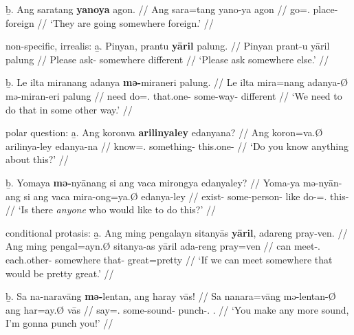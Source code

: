 	\b{b.} \begingl
		\gla Ang saratang \textbf{yanoya} agon. //
		\glb Ang sara=tang yano-ya agon //
		\glc \AgtT{} go=\TplM{}.\Aarg{} place-\Loc{} foreign //
		\glft `They are going somewhere foreign.' //
		\endgl
	\endsubsub

\a non-specific, irrealis:\vspace{.5em} %
	\beginsubsub
	\b{a.} \begingl
		\gla Pinyan, prantu \textbf{yāril} palung. //
		\glb Pinyan prant-u yāril palung //
		\glc Please ask-\Imp{} somewhere different //
		\glft `Please ask somewhere else.' //
		\endgl\vspace{.5em}
		
	\b{b.} \begingl
		\gla Le ilta miranang adanya \textbf{mə-}miraneri 
			palung. //
		\glb Le ilta mira=nang adanya-Ø mə-miran-eri palung //
		\glc \PatTI{} need do=\Fsg{}.\Aarg{} that.one-\Top{} 
			some-way-\Ins{} different //
		\glft `We need to do that in some other way.' //
		\endgl
	\endsubsub

\a polar question:\vspace{.5em} %
	\beginsubsub
	\b{a.} \begingl
		\gla Ang koronva \textbf{arilinyaley} edanyana? //
		\glb Ang koron=va.Ø arilinya-ley edanya-na //
		\glc \AgtT{} know=\Ssg{}.\Top{} something-\PargI{} 
			this.one-\Gen{} //
		\glft `Do you know anything about this?' //
		\endgl\vspace{.5em}
		
	\b{b.} \begingl
		\gla Yomaya \textbf{mə-}nyānang si ang vaca mirongya 
			edanyaley? //
		\glb Yoma-ya mə-nyān-ang si ang vaca mira-ong=ya.Ø
			edanya-ley //
		\glc exist-\TsgM{} some-person-\Aarg{} \Rel{} \AgtT{} 
			like do-\Irr{}=\TsgM{}.\Top{} this-\PargI{} //
		\glft `Is there \emph{anyone} who would like to do this?' //
		\endgl
	\endsubsub

\a conditional protasis:\vspace{.5em} %
	\beginsubsub
	\b{a.} \begingl
		\gla Ang ming pengalayn sitanyās \textbf{yāril}, adareng 
			pray-ven. //
		\glb Ang ming pengal=ayn.Ø sitanya-as yāril ada-reng 
			pray=ven //
		\glc \AgtT{} can meet-\Fpl{}.\Top{} each.other-\Parg{} 
			somewhere that-\AargI{} great=pretty //
		\glft `If we can meet somewhere that would be pretty great.' //
		\endgl\vspace{.5em}
		
	\b{b.} \begingl
		\gla Sa na-naravāng \textbf{mə-}lentan, ang haray vās! //
		\glb Sa na\til{}nara=vāng mə-lentan-Ø ang har=ay.Ø vās //
		\glc \PatT{} \Iter{}\til{}say=\Ssg{}.\Aarg{} some-sound-\Top{} 
			\AgtT{} punch-\Fsg{}.\Top{} \Ssg{}.\Parg{} //
		\glft `You make any more sound, I'm gonna punch you!' //
		\endgl
	\endsubsub

